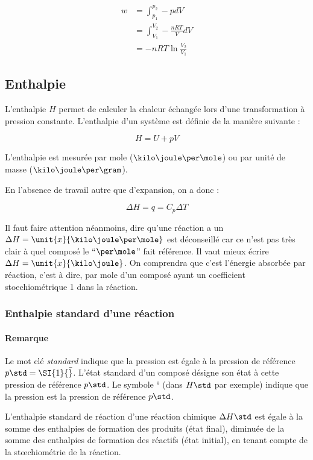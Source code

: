 \begin{align*}
		w 	&= \int_{p_1}^{p_2} -p dV\\
				&= \int_{V_1}^{V_2} -\frac{nRT}{V} dV\\
        &= -nRT \ln \frac{V_2}{V_1}
\end{align*}

\subsection{Enthalpie} \label{sec:DH}
L'enthalpie $H$ permet de calculer la chaleur échangée lors d'une transformation
à pression constante. L'enthalpie d'un système est définie de la manière suivante :

$$H = U + pV$$

L'enthalpie est mesurée par mole ($\kilo\joule\per\mole$) ou par unité de masse ($\kilo\joule\per\gram$).

En l'absence de travail autre que d'expansion, on a donc :

$$\Delta H = q = C_p \Delta T$$

Il faut faire attention néanmoins,
dire qu'une réaction a un $\Delta H = \unit{x}{\kilo\joule\per\mole}$ est déconseillé car ce n'est pas très clair à quel composé le ``$\per\mole$'' fait référence.
Il vaut mieux écrire $\Delta H = \unit{x}{\kilo\joule}$.
On comprendra que c'est l'énergie absorbée par réaction,
c'est à dire,
par mole d'un composé ayant un coefficient stoechiométrique 1 dans la réaction.

\subsubsection{Enthalpie standard d'une réaction}

\paragraph{Remarque}
Le mot clé \textit{standard} indique que la pression est égale
à la pression de référence $p\std = \SI{1}{\bar}$. L'état standard 
d'un composé désigne son état à cette pression de référence $p\std$.
Le symbole ° (dans $H\std$ par exemple) indique que la pression est 
la pression de référence $p\std$.

L'enthalpie standard de réaction d'une réaction chimique $\Delta H\std$ est égale à la somme 
des enthalpies de formation des produits (état final),
diminuée de la somme des enthalpies de formation des
réactifs (état initial), en tenant compte de la st\oe{}chiométrie de la réaction.

